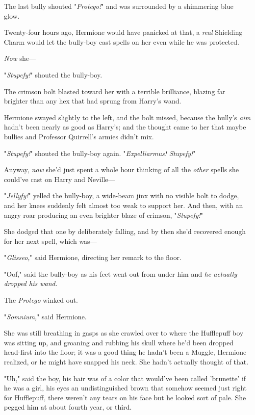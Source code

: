 The last bully shouted "\emph{Protego!}" and was surrounded by a shimmering 
blue glow.

Twenty-four hours ago, Hermione would have panicked at that, a \emph{real} 
Shielding Charm would let the bully-boy cast spells on her even while he was 
protected.

\emph{Now} she---

"\emph{Stupefy!}" shouted the bully-boy.

The crimson bolt blasted toward her with a terrible brilliance, blazing far 
brighter than any hex that had sprung from Harry's wand.

Hermione swayed slightly to the left, and the bolt missed, because the bully's 
\emph{aim} hadn't been nearly as good as Harry's; and the thought came to her 
that maybe bullies and Professor Quirrell's armies didn't mix.

"\emph{Stupefy!}" shouted the bully-boy again. "\emph{Expelliarmus! Stupefy!}"

Anyway, \emph{now} she'd just spent a whole hour thinking of all the 
\emph{other} spells she could've cast on Harry and Neville---

"\emph{Jellyfy!}" yelled the bully-boy, a wide-beam jinx with no visible bolt 
to dodge, and her knees suddenly felt almost too weak to support her. And then, 
with an angry roar producing an even brighter blaze of crimson, 
"\emph{Stupefy!}"

She dodged that one by deliberately falling, and by then she'd recovered enough 
for her next spell, which was---

"\emph{Glisseo,}" said Hermione, directing her remark to the floor.

"Oof," said the bully-boy as his feet went out from under him and \emph{he 
actually dropped his wand.}

The \emph{Protego} winked out.

"\emph{Somnium,}" said Hermione.

She was still breathing in gasps as she crawled over to where the Hufflepuff 
boy was sitting up, and groaning and rubbing his skull where he'd been dropped 
head-first into the floor; it was a good thing he hadn't been a Muggle, 
Hermione realized, or he might have snapped his neck. She hadn't actually 
thought of that.

"Uh," said the boy, his hair was of a color that would've been called 
'brunette' if he was a girl, his eyes an undistinguished brown that somehow 
seemed just right for Hufflepuff, there weren't any tears on his face but he 
looked sort of pale. She pegged him at about fourth year, or third.

